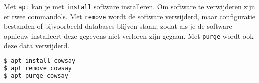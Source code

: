 Met \texttt{apt} kan je met \texttt{install} software installeren. Om software te verwijderen zijn er twee commando's. Met \texttt{remove} wordt de software verwijderd, maar configuratie bestanden of bijvoorbeeld databases blijven staan, zodat als je de software opnieuw installeert deze gegevens niet verloren zijn gegaan. Met \texttt{purge} wordt ook deze data verwijderd.

\begin{lstlisting}[language=bash]
$ apt install cowsay
$ apt remove cowsay
$ apt purge cowsay
\end{lstlisting}

